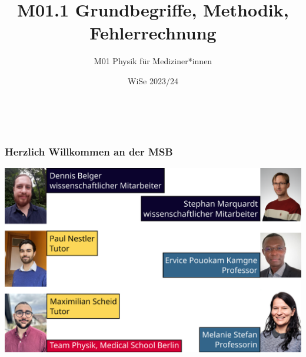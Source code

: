 \documentclass{beamer}
\title[M01.1 Grundbegriffe]{M01.1 Grundbegriffe, Methodik, Fehlerrechnung}
\author[melanie.stefan@medicalschool-berlin.de]{M01 Physik für Mediziner*innen}
\institute[]{Prof. Melanie Stefan - melanie.stefan@medicalschool-berlin.de}
\date{WiSe 2023/24}
\begin{document}
 
 
 
{  
\begin{frame}

 \maketitle 

$\,$\\[6cm] 


\end{frame} 
}


\begin{frame}
\frametitle{Herzlich Willkommen an der MSB}


\begin{center}
    \includegraphics[width=\textwidth]{team_physik_sose23.png}
\end{center}

\end{frame}
\end{document}

